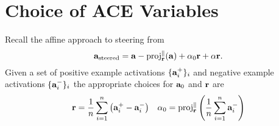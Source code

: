 \chapter{Choice of ACE Variables}
\label{app:ace}

\begin{remark}
    Recall the affine approach to steering from 
    \begin{equation*}
        \mathbf{a}_\text{\normalfont steered} = \mathbf{a} - \text{\normalfont proj}_{\mathbf{r}}^{\parallel}(\mathbf{a}) + \alpha_0\mathbf{r} + \alpha\mathbf{r}.
    \end{equation*}
    Given a set of positive example activations $\{\mathbf{a}_i^+\}_i$ and negative example activations $\{\mathbf{a}_i^-\}_i$ the appropriate choices for $\mathbf{a}_0$ and $\mathbf{r}$ are
    \begin{equation}
        \label{eq:ace-app}
        \begin{aligned}
            \mathbf{r} = \frac{1}{n}\sum_{i=1}^{n}\left(\mathbf{a}_i^+ - \mathbf{a}_i^-\right) && \alpha_0 = \text{\normalfont proj}_{\mathbf{r}}^\parallel\left(\frac{1}{n}\sum_{i=1}^{n}\mathbf{a}_i^-\right)
        \end{aligned}
    \end{equation}
\end{remark}
